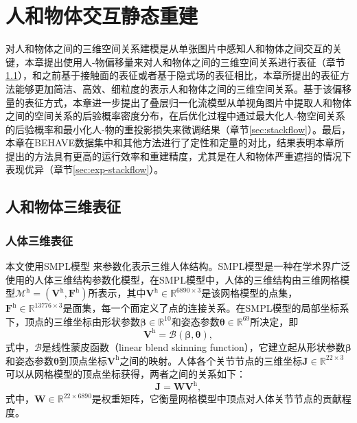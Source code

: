 \chapter{人和物体交互静态重建}\label{chap:stackflow}
对人和物体之间的三维空间关系建模是从单张图片中感知人和物体之间交互的关键，本章提出使用人-物偏移量来对人和物体之间的三维空间关系进行表征（章节\ref{sec:offset-representation}），和之前基于接触面的表征或者基于隐式场的表征相比，本章所提出的表征方法能够更加简洁、高效、细粒度的表示人和物体之间的三维空间关系。基于该偏移量的表征方式，本章进一步提出了叠层归一化流模型从单视角图片中提取人和物体之间的空间关系的后验概率密度分布，在后优化过程中通过最大化人-物空间关系的后验概率和最小化人-物的重投影损失来微调结果（章节\ref{sec:stackflow}）。最后，本章在BEHAVE数据集中和其他方法进行了定性和定量的对比，结果表明本章所提出的方法具有更高的运行效率和重建精度，尤其是在人和物体严重遮挡的情况下表现优异（章节\ref{sec:exp-stackflow}）。

\section{人和物体三维表征}\label{sec:offset-representation}
\subsection{人体三维表征}
本文使用SMPL模型
来参数化表示三维人体结构。SMPL模型\citep{SMPL}是一种在学术界广泛使用的人体三维结构参数化模型，在SMPL模型中，人体的三维结构由三维网格模型$\mathcal{M}^{\text{h}}=(\mathbf{V}^{\text{h}},  \mathbf{F}^{\text{h}})$所表示，其中$\mathbf{V}^{\text{h}} \in \mathbb{R}^{6890 \times 3}$是该网格模型的点集，$\mathbf{F}^{\text{h}} \in \mathbb{R}^{13776 \times 3}$是面集，每一个面定义了点的连接关系。在SMPL模型的局部坐标系下，顶点的三维坐标由形状参数$\mathbf{\beta} \in \mathbb{R}^{10}$和姿态参数$\mathbf{\theta} \in \mathbb{R}^{69}$所决定，即
\begin{equation}\label{eq:smpl-blending}
	\mathbf{V}^{\text{h}} = \mathcal{B}(\mathbf{\beta}, \mathbf{\theta}),
\end{equation}
式中，$\mathcal{B}$是线性蒙皮函数（linear  blend skinning function），它建立起从形状参数$\mathbf{\beta}$和姿态参数$\mathbf{\theta}$到顶点坐标$\mathbf{V}^{\text{h}}$之间的映射。人体各个关节节点的三维坐标$\mathbf{J} \in \mathbb{R}^{22 \times 3}$可以从网格模型的顶点坐标获得，两者之间的关系如下：
\begin{equation}
	\mathbf{J} = \mathbf{W} \mathbf{V}^{\text{h}},
\end{equation}
式中，$\mathbf{W} \in \mathbb{R}^{22 \times 6890}$是权重矩阵，它衡量网格模型中顶点对人体关节节点的贡献程度。

